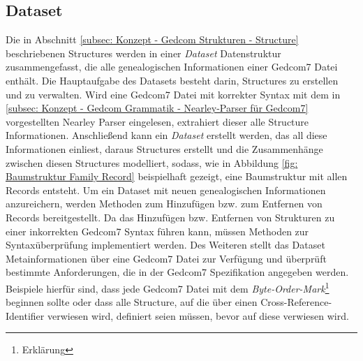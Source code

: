 \subsection{Dataset}
\label{subsec: Konzept - Gedcom Strukturen - Dataset}
Die in Abschnitt \ref{subsec: Konzept - Gedcom Strukturen - Structure} beschriebenen Structures werden in einer \textit{Dataset} Datenstruktur zusammengefasst, die alle genealogischen Informationen einer Gedcom7 Datei enthält. Die Hauptaufgabe des Datasets besteht darin, Structures zu erstellen und zu verwalten. Wird eine Gedcom7 Datei mit korrekter Syntax mit dem in \ref{subsec: Konzept - Gedcom Grammatik - Nearley-Parser für Gedcom7} vorgestellten Nearley Parser eingelesen, extrahiert dieser alle Structure Informationen. Anschließend kann ein \textit{Dataset} erstellt werden, das all diese Informationen einliest, daraus Structures erstellt und die Zusammenhänge zwischen diesen Structures modelliert, sodass, wie in Abbildung \ref{fig: Baumstruktur Family Record} beispielhaft gezeigt, eine Baumstruktur mit allen Records entsteht. Um ein Dataset mit neuen genealogischen Informationen anzureichern, werden Methoden zum Hinzufügen bzw. zum Entfernen von Records bereitgestellt. Da das Hinzufügen bzw. Entfernen von Strukturen zu einer inkorrekten Gedcom7 Syntax führen kann, müssen Methoden zur Syntaxüberprüfung implementiert werden. Des Weiteren stellt das Dataset Metainformationen über eine Gedcom7 Datei zur Verfügung und überprüft bestimmte Anforderungen, die in der Gedcom7 Spezifikation angegeben werden. Beispiele hierfür sind, dass jede Gedcom7 Datei mit dem \textit{Byte-Order-Mark}\footnote{Erklärung} beginnen sollte oder dass alle Structure, auf die über einen Cross-Reference-Identifier verwiesen wird, definiert seien müssen, bevor auf diese verwiesen wird. 

